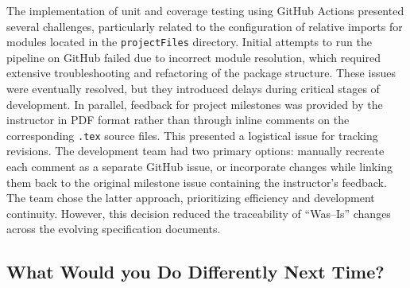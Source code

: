 \documentclass{article}
\begin{document}
The implementation of unit and coverage testing using GitHub Actions presented several challenges, particularly related to the configuration of relative imports for modules located in the \texttt{projectFiles} directory. Initial attempts to run the pipeline on GitHub failed due to incorrect module resolution, which required extensive troubleshooting and refactoring of the package structure. These issues were eventually resolved, but they introduced delays during critical stages of development.
\newline\newline
In parallel, feedback for project milestones was provided by the instructor in PDF format rather than through inline comments on the corresponding \texttt{.tex} source files. This presented a logistical issue for tracking revisions. The development team had two primary options: manually recreate each comment as a separate GitHub issue, or incorporate changes while linking them back to the original milestone issue containing the instructor's feedback. The team chose the latter approach, prioritizing efficiency and development continuity. However, this decision reduced the traceability of ``Was--Is'' changes across the evolving specification documents.


\subsection{What Would you Do Differently Next Time?}
\end{document}
